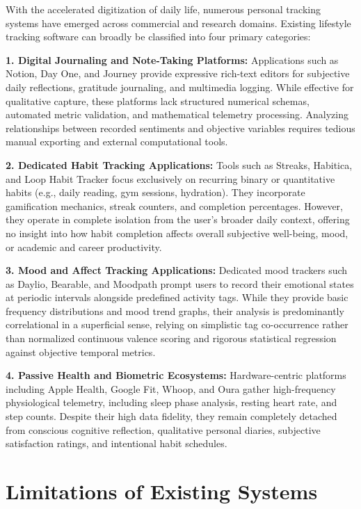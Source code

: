 With the accelerated digitization of daily life, numerous personal tracking systems have emerged across commercial and research domains. Existing lifestyle tracking software can broadly be classified into four primary categories:

\textbf{1. Digital Journaling and Note-Taking Platforms:}
Applications such as Notion, Day One, and Journey provide expressive rich-text editors for subjective daily reflections, gratitude journaling, and multimedia logging. While effective for qualitative capture, these platforms lack structured numerical schemas, automated metric validation, and mathematical telemetry processing. Analyzing relationships between recorded sentiments and objective variables requires tedious manual exporting and external computational tools.

\textbf{2. Dedicated Habit Tracking Applications:}
Tools such as Streaks, Habitica, and Loop Habit Tracker focus exclusively on recurring binary or quantitative habits (e.g., daily reading, gym sessions, hydration). They incorporate gamification mechanics, streak counters, and completion percentages. However, they operate in complete isolation from the user's broader daily context, offering no insight into how habit completion affects overall subjective well-being, mood, or academic and career productivity.

\textbf{3. Mood and Affect Tracking Applications:}
Dedicated mood trackers such as Daylio, Bearable, and Moodpath prompt users to record their emotional states at periodic intervals alongside predefined activity tags. While they provide basic frequency distributions and mood trend graphs, their analysis is predominantly correlational in a superficial sense, relying on simplistic tag co-occurrence rather than normalized continuous valence scoring and rigorous statistical regression against objective temporal metrics.

\textbf{4. Passive Health and Biometric Ecosystems:}
Hardware-centric platforms including Apple Health, Google Fit, Whoop, and Oura gather high-frequency physiological telemetry, including sleep phase analysis, resting heart rate, and step counts. Despite their high data fidelity, they remain completely detached from conscious cognitive reflection, qualitative personal diaries, subjective satisfaction ratings, and intentional habit schedules.

\section{Limitations of Existing Systems}

